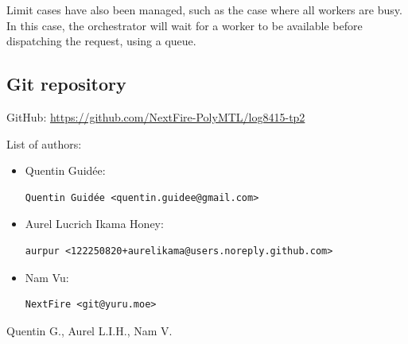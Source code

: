 \documentclass[letterpaper,headings=standardclasses,parskip=half]{scrartcl}
\begin{document}
Limit cases have also been managed, such as the case where all workers are busy. In this case, the orchestrator will wait for a worker to be available before dispatching the request, using a queue.


\subsection*{Git repository}

GitHub: \url{https://github.com/NextFire-PolyMTL/log8415-tp2}

List of authors:

\begin{itemize}
    \item Quentin Guidée:
          \begin{lstlisting}
Quentin Guidée <quentin.guidee@gmail.com>
\end{lstlisting}
    \item Aurel Lucrich Ikama Honey:
          \begin{lstlisting}
aurpur <122250820+aurelikama@users.noreply.github.com>
\end{lstlisting}
    \item Nam Vu:
          \begin{lstlisting}
NextFire <git@yuru.moe>
\end{lstlisting}
\end{itemize}


Quentin G., Aurel L.I.H., Nam V.

\end{document}
